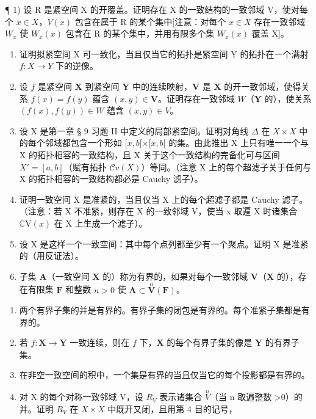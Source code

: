 \BourbakiExerciseGroup

¶ 1) 设 R 是紧空间 X 的开覆盖。证明存在 X 的一致结构的一致邻域 V，使对每个 \(x \in X\)，\(V(x)\) 包含在属于 R 的某个集中{[}注意：对每个 \(x \in X\) 存在一致邻域 \(W_x\) 使 \(\dot{W}_x(x)\) 包含在 R 的某个集中，并用有限多个集 \(W_x(x)\) 覆盖 X{]}。

\begin{enumerate}
\def\labelenumi{\arabic{enumi})}
\setcounter{enumi}{1}
\item
  证明拟紧空间 X 可一致化，当且仅当它的拓扑是紧空间 Y 的拓扑在一个满射 \(f: X \rightarrow Y\) 下的逆像。
\item
  设 \(f\) 是紧空间 \(\mathbf{X}\) 到紧空间 \(\mathbf{Y}\) 中的连续映射，\(\mathbf{V}\) 是 \(\mathbf{X}\) 的开一致邻域，使得关系 \(f(x) = f(y)\) 蕴含 \((x, y) \in \mathbf{V}\)。证明存在一致邻域 \(W\)（\(\mathbf{Y}\) 的），使关系 \((f(x), f(y)) \in W\) 蕴含 \((x, y) \in V\)。
\item
  设 X 是第一章 § 9 习题 II 中定义的局部紧空间。证明对角线 \(\Delta\) 在 \(X \times X\) 中的每个邻域都包含一个形如 \([x, b[ \times [x, b[\) 的集。由此推出 X 上只有唯一一个与 X 的拓扑相容的一致结构，且 X 关于这个一致结构的完备化可与区间 \(X' = [a, b]\)（赋有拓扑 \(\mathcal{C}v(X)\)）等同。（注意 X 上的每个超滤子关于任何与 X 的拓扑相容的一致结构都必是 Cauchy 滤子）。
\item
  证明一致空间 X 是准紧的，当且仅当 X 上的每个超滤子都是 Cauchy 滤子。（注意：若 X 不准紧，则存在 X 的一致邻域 V，使当 x 取遍 X 时诸集合 \(\mathbb{C}\mathrm{V}(x)\) 在 X 上生成一个滤子）。
\item
  设 X 是这样一个一致空间：其中每个点列都至少有一个聚点。证明 X 是准紧的（用反证法）。
\item
  子集 \(\mathbf{A}\)（一致空间 \(\mathbf{X}\) 的）称为有界的，如果对每个一致邻域 \(\mathbf{V}\)（\(\mathbf{X}\) 的），存在有限集 \(\mathbf{F}\) 和整数 \(n > 0\) 使 \(\mathbf{A} \subset \overset{n}{\mathbf{V}}(\mathbf{F})\)。
\end{enumerate}

\begin{enumerate}
\def\labelenumi{\alph{enumi})}
\item
  两个有界子集的并是有界的。有界子集的闭包是有界的。每个准紧子集都是有界的。
\item
  若 \(f: \mathbf{X} \to \mathbf{Y}\) 一致连续，则在 \(f\) 下，\(\mathbf{X}\) 的每个有界子集的像是 \(\mathbf{Y}\) 的有界子集。
\item
  在非空一致空间的积中，一个集是有界的当且仅当它的每个投影都是有界的。
\item
  对 X 的每个对称一致邻域 V，设 \(R_{V}\) 表示诸集合 \(\stackrel{n}{V}\)（当 n 取遍整数 \textgreater0）的并。证明 \(R_{V}\) 在 \(X \times X\) 中既开又闭，且用第 4 目的记号，
\end{enumerate}

